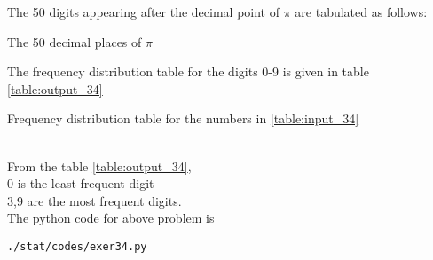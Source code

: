 The 50 digits appearing after the decimal point of $\pi$ are tabulated as follows:\\
\begin{table}[ht!]
\centering

\caption{The 50 decimal places of $\pi$}
\label{table:input_34}
\end{table}
The frequency distribution table for the digits 0-9 is given in table \ref{table:output_34}
\begin{table}[ht!]
\centering

\caption{Frequency distribution table for the numbers in \ref{table:input_34}}
\label{table:output_34}
\end{table}
\\From the table \ref{table:output_34},\\
0 is the least frequent digit \\
3,9 are the most frequent digits.\\
The python code for above problem is 
\begin{lstlisting}
./stat/codes/exer34.py
\end{lstlisting}
